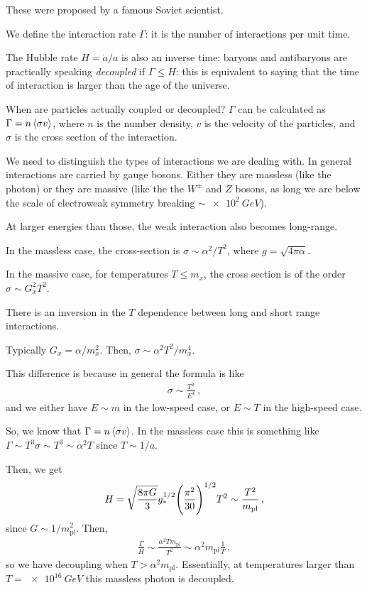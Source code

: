 \documentclass[main.tex]{subfiles}
\begin{document}
These were proposed by a famous Soviet scientist.

We define the interaction rate \(\Gamma \): it is the number of interactions per unit time.

The Hubble rate \(H = \dot{a} / a \) is also an inverse time: baryons and antibaryons are practically speaking \emph{decoupled} if \(\Gamma \leq H\): this is equivalent to saying that the time of interaction is larger than the age of the universe.

When are particles actually coupled or decoupled?
\(\Gamma \) can be calculated as \(\Gamma = n \expval{\sigma v}\), where \(n\) is the number density, \(v\) is the velocity of the particles, and \(\sigma \) is the cross section of the interaction.

We need to distinguish the types of interactions we are dealing with.
In general interactions are carried by gauge bosons. 
Either they are massless (like the photon) or they are massive (like the the \(W^{\pm}\) and \(Z\) bosons, as long we are below the scale of electroweak symmetry breaking \(\sim \SI{e2}{GeV}\)).

At larger energies than those, the weak interaction also becomes long-range.

In the massless case, the cross-section is \(\sigma \sim \alpha^2 / T^2\), where \(g = \sqrt{4 \pi \alpha }\).

In the massive case, for temperatures \(T \leq m_{x}\), the cross section is of the order \(\sigma \sim G_x^2 T^2\).

There is an inversion in the \(T\) dependence between long and short range interactions.

Typically \(G_x = \alpha / m_x^2\).  Then, \(\sigma \sim \alpha^2 T^2 / m_x^{4}\).

This difference is because in general the formula is like 
%
\begin{align}
  \sigma \sim \frac{T^{2}}{E^{4}}
\,,
\end{align}
%
and we either have \(E \sim m\) in the low-speed case, or \(E \sim T\) in the high-speed case.

So, we know that \(\Gamma = n \expval{\sigma v}\). In the massless case this is something like \(\Gamma \sim T^3 \sigma \sim T^{3} \sim \alpha^2 T\) since \(T \sim 1/ a\).

Then, we get 
%
\begin{align}
  H = \sqrt{\frac{8 \pi G }{3}} g_{*}^{1/2} \qty(\frac{\pi^2}{30})^{1/2} T^2 \sim \frac{T^2}{m _{\text{pl}}}
\,,
\end{align}
%
since \(G \sim 1/m _{\text{pl}}^2\). Then, 
%
\begin{align}
  \frac{\Gamma}{H} \sim \frac{\alpha^2 T m _{\text{pl}}}{T^2} \sim \alpha^2 m _{\text{pl}} \frac{1}{T}
\,,
\end{align}
%
so we have decoupling when \(T > \alpha^2 m _{\text{pl}}\).
Essentially, at temperatures larger than \(T = \SI{e16}{GeV}\) this massless photon is decoupled.
\end{document}

